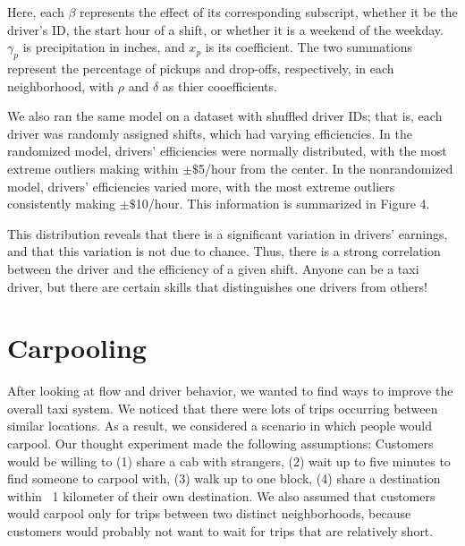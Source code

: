 \documentclass[]{article}
\begin{document}
\begin{multicols}{2}
Here, each $\beta$ represents the effect of its corresponding subscript, whether it be the driver’s ID, the start hour of a shift, or whether it is a weekend of the weekday. $\gamma_p$ is precipitation in inches, and $x_p$ is its coefficient. The two summations represent the percentage of pickups and drop-offs, respectively, in each neighborhood, with $\rho$ and $\delta$ as thier cooefficients.

We also ran the same model on a dataset with shuffled driver IDs; that is, each driver was randomly assigned shifts, which had varying efficiencies. In the randomized model, drivers' efficiencies were normally distributed, with the most extreme outliers making within $\pm$$\$$5/hour from the center. In the nonrandomized model, drivers' efficiencies varied more, with the most extreme outliers consistently making $\pm$$\$$10/hour. This information is summarized in Figure 4.

This distribution reveals that there is a significant variation in drivers’ earnings, and that this variation is not due to chance. Thus, there is a strong correlation between the driver and the efficiency of a given shift. Anyone can be a taxi driver, but there are certain skills that distinguishes one drivers from others! 
\section{Carpooling}
After looking at flow and driver behavior, we wanted to find ways to improve the overall taxi system. We noticed that there were lots of trips occurring between similar locations. As a result, we considered a scenario in which people would carpool. Our thought experiment made the following assumptions: Customers would be willing to (1) share a cab with strangers, (2) wait up to five minutes to find someone to carpool with, (3) walk up to one block, (4) share a destination within ~1 kilometer of their own destination. We also assumed that customers would carpool only for trips between two distinct neighborhoods, because customers would probably not want to wait for trips that are relatively short.


\end{multicols}
\end{document}
